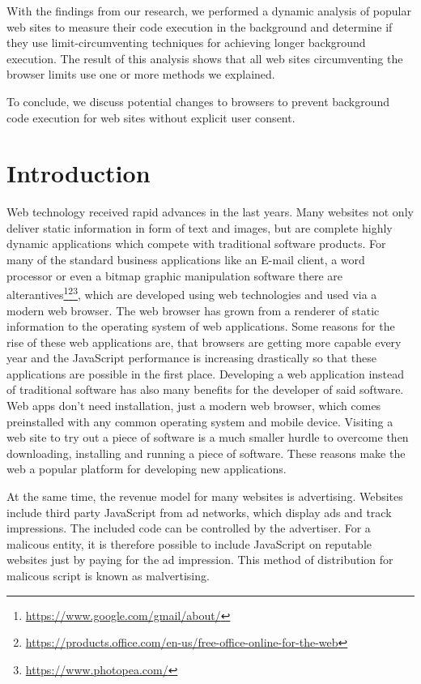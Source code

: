\documentclass[
	ngerman,
	ruledheaders=section,%
	class=report,%
	thesis={type=bachelor},%
	accentcolor=9c,%
	custommargins=true,%
	marginpar=false,%
	parskip=half-,%
	fontsize=11pt,%
]{tudapub}
\begin{document}
  With the findings from our research, we performed a dynamic analysis of popular web sites to measure their code execution in the background and determine if they use limit-circumventing techniques for achieving longer background execution. The result of this analysis shows that all web sites circumventing the browser limits use one or more methods we explained.

  To conclude, we discuss potential changes to browsers to prevent background code execution for web sites without explicit user consent.

  
  \newpage

  \tableofcontents


  \newpage
  \chapter{Introduction}

  Web technology received rapid advances in the last years. Many websites not only deliver static information in form of text and images, but are complete highly dynamic applications which compete with traditional software products. For many of the standard business applications like an E-mail client, a word processor or even a bitmap graphic manipulation software there are alterantives\footnote{\url{https://www.google.com/gmail/about/}}\footnote{\url{https://products.office.com/en-us/free-office-online-for-the-web}}\footnote{\url{https://www.photopea.com/}}, which are developed using web technologies and used via a modern web browser. The web browser has grown from a renderer of static information to the operating system of web applications. Some reasons for the rise of these web applications are, that browsers are getting more capable every year and the JavaScript performance is increasing drastically so that these applications are possible in the first place. Developing a web application instead of traditional software has also many benefits for the developer of said software. Web apps don't need installation, just a modern web browser, which comes preinstalled with any common operating system and mobile device. Visiting a web site to try out a piece of software is a much smaller hurdle to overcome then downloading, installing and running a piece of software. These reasons make the web a popular platform for developing new applications.

  At the same time, the revenue model for many websites is advertising. Websites include third party JavaScript from ad networks, which display ads and track impressions. The included code can be controlled by the advertiser. For a malicous entity, it is therefore possible to include JavaScript on reputable websites just by paying for the ad impression. This method of distribution for malicous script is known as malvertising\cite{wiki:malvertising}.
\end{document}
